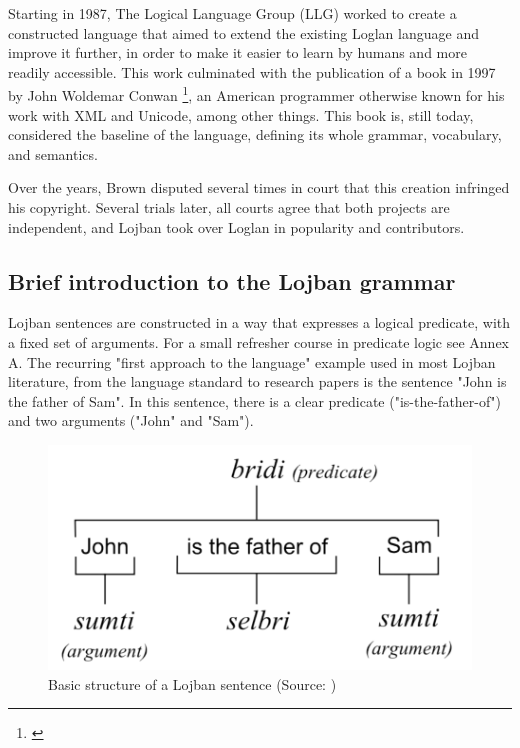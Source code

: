 Starting in 1987, The Logical Language Group (LLG) worked to create a constructed language that aimed to extend the existing Loglan language and improve it further,
in order to make it easier to learn by humans and more readily accessible. This work culminated with the publication of a book in 1997 by
John Woldemar Conwan \footnote{\cite{cowan1997complete}}, an American programmer otherwise known for his work with XML and Unicode, among other things. This book is,
still today, considered the baseline of the language, defining its whole grammar, vocabulary, and semantics.\newline

Over the years, Brown disputed several times in court that this creation infringed his copyright. Several trials later, all courts agree that both projects are independent,
and Lojban took over Loglan in popularity and contributors.

\subsection{Brief introduction to the Lojban grammar}

Lojban sentences are constructed in a way that expresses a logical predicate, with a fixed set of arguments. For a small
refresher course in predicate logic see Annex A. The recurring "first approach to the language" example used in most Lojban
literature, from the language standard to research papers is the sentence "John is the father of Sam". In this sentence, there
is a clear predicate ("is-the-father-of") and two arguments ("John" and "Sam").

\begin{figure}[H]
\centering
\includegraphics[scale=0.20]{common/images/lojban_grammar.png}
\caption{Basic structure of a Lojban sentence (Source: \cite{cowan1997complete})}
\end{figure}

